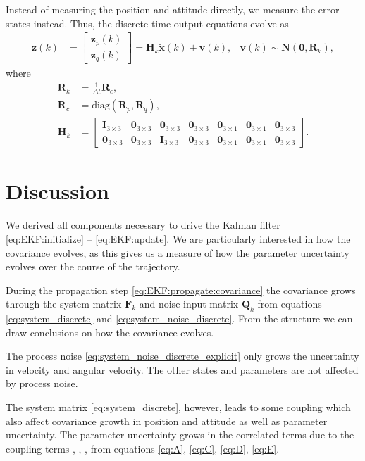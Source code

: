 \documentclass[10pt,a4paper]{article}
\newcommand{\zthree}{\mathbf{0}_{3\times3}}
\newcommand{\zthreeone}{\mathbf{0}_{3\times1}}
\newcommand{\identity}{\mathbf{I}_{3\times3}}
\begin{document}
Instead of measuring the position and attitude directly, we measure the error states instead.  Thus, the discrete time output equations evolve as
\begin{align}
\mathbf{z}(k) &= \begin{bmatrix}
\mathbf{z}_p(k) \\ \mathbf{z}_q(k)
\end{bmatrix} = \mathbf{H}_k \tilde{\mathbf{x}}(k) + \mathbf{v}(k) , &\mathbf{v}(k) \sim \mathcal{\mathbf{N}} \left( \mathbf{0}, \mathbf{R}_k \right), 
\end{align}
where
\begin{align}
\mathbf{R}_k &= \frac{1}{\Delta t} \mathbf{R}_c, \\
\mathbf{R}_c &= \mathrm{diag} \left( \mathbf{R}_p, \mathbf{R}_q \right), \\
\mathbf{H}_k &= \begin{bmatrix}
\identity & \zthree & \zthree & \zthree & \zthreeone & \zthreeone & \zthree \\
\zthree & \zthree & \identity & \zthree & \zthreeone & \zthreeone & \zthree
\end{bmatrix}.
\end{align}

\section{Discussion}
We derived all components necessary to drive the Kalman filter \ref{eq:EKF:initialize} -- \ref{eq:EKF:update}. We are particularly interested in how the covariance evolves, as this gives us a measure of how the parameter uncertainty evolves over the course of the trajectory. 

During the propagation step \ref{eq:EKF:propagate:covariance} the covariance grows through the system matrix $\mathbf{F}_k$ and noise input matrix $\mathbf{Q}_k$ from equations \ref{eq:system_discrete} and \ref{eq:system_noise_discrete}. From the structure we can draw conclusions on how the covariance evolves.

The process noise \ref{eq:system_noise_discrete_explicit} only grows the uncertainty in velocity and angular velocity. The other states and parameters are not affected by process noise. 

The system matrix \ref{eq:system_discrete}, however, leads to some coupling which also affect covariance growth in position and attitude as well as parameter uncertainty. The parameter uncertainty grows in the correlated terms due to the coupling terms , , ,  from equations \ref{eq:A}, \ref{eq:C}, \ref{eq:D}, \ref{eq:E}. 
\end{document}
